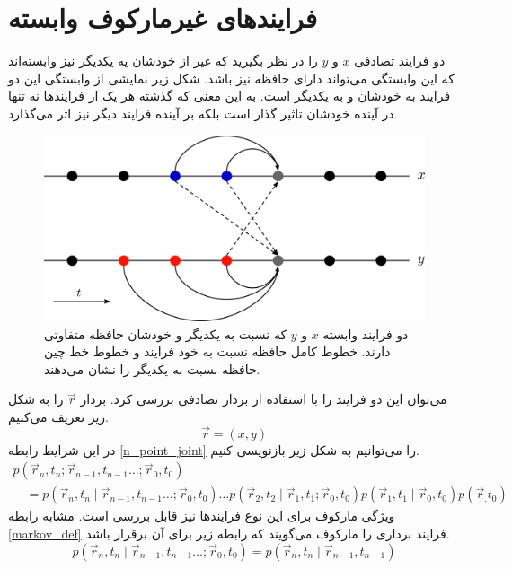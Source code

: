 \section{فرایندهای غیرمارکوف وابسته}
دو فرایند تصادفی $x$ و $y$ را در نظر بگیرید که غیر از خودشان یه یکدیگر نیز وابسته‌اند که این وابستگی می‌تواند دارای حافظه نیز باشد. شکل زیر نمایشی از وابستگی این دو فرایند به خودشان و به یکدیگر است. به این معنی که گذشته هر یک 
از فرایندها نه تنها در آینده خودشان تاثیر گذار است بلکه بر آینده فرایند دیگر نیز اثر می‌گذارد.
\begin{figure}[H]
  \centering
  \includegraphics[scale=1]{images/coupled_hm.png}
  \caption{دو فرایند وابسته $x$ و $y$ که نسبت به یکدیگر و خودشان حافظه متفاوتی دارند. خطوط کامل حافظه نسبت به خود
  فرایند و خطوط خط چین حافظه نسبت به یکدیگر را نشان می‌دهند.}
\end{figure}
\FloatBarrier
می‌توان این دو فرایند را با استفاده از بردار تصادفی بررسی کرد. بردار $\vec{r}$ را به شکل زیر تعریف می‌کنیم.
\begin{equation}
  \vec{r} = (x, y)
  \label{stoch_vec}
\end{equation}
در این شرایط رابطه \ref{n_point_joint} را می‌توانیم به شکل زیر بازنویسی کنیم.
\begin{equation}
  \begin{array}{l}
  p(\vec{r}_n,t_n; \vec{r}_{n-1},t_{n-1} \dotsc ;\vec{r}_{0},t_0) \\ 
  \quad = p(\vec{r}_{n},t_n \mid \vec{r}_{n-1},t_{n-1} \dotsc ; \vec{r}_{0},t_{0}) \dotsc p(\vec{r}_{2},t_{2} \mid \vec{r}_{1},t_{1};\vec{r}_{0},t_{0}) p(\vec{r}_{1},t_{1} \mid \vec{r}_{0},t_{0}) p(\vec{r}_,t_0)
  \end{array}
  \label{n_point_joint_vec}
\end{equation}
ویژگی مارکوف برای این نوع فرایندها نیز قابل بررسی است. مشابه رابطه \ref{markov_def} فرایند برداری را مارکوف می‌گویند که رابطه زیر برای آن برقرار باشد.
\begin{equation}
  p(\vec{r}_n,t_n \mid \vec{r}_{n-1},t_{n-1} \dotsc ;\vec{r}_{0},t_0) = p(\vec{r}_n,t_n \mid \vec{r}_{n-1},t_{n-1})
  \label{markov_def_vec}
\end{equation}
